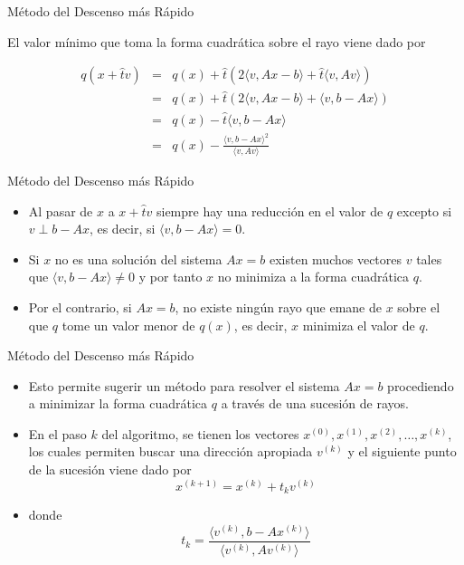 \documentclass[10pt]{beamer}
\begin{document}
\begin{frame}{M\'etodo del Descenso m\'as R\'apido}
  
El valor m\'inimo que toma la forma cuadr\'atica sobre el rayo viene dado por

\begin{eqnarray}
\nonumber  q(x+\hat t v) & = & q(x) + \hat t\left(2\langle v,Ax-b \rangle + \hat t\langle v,Av \rangle\right)\\
\nonumber & = & q(x) + \hat t\left(2\langle v,Ax-b \rangle + \langle v,b-Ax \rangle\right)\\
\nonumber & = & q(x) - \hat t\langle v,b-Ax \rangle\\
\nonumber & = & q(x) - \frac{\langle v,b-Ax \rangle^2}{\langle v,Av\rangle}
\end{eqnarray}
\end{frame}
\begin{frame}{M\'etodo del Descenso m\'as R\'apido}
  \begin{itemize}
    \item Al pasar de $x$ a $x+\hat tv$ siempre hay una reducci\'on en el valor de $q$ excepto si $v \perp b-Ax$, es decir, si $\langle v,b-Ax\rangle=0$.
    \item<2->Si $x$ no es una soluci\'on del sistema $Ax=b$ existen muchos vectores $v$ tales que $\langle v,b-Ax\rangle\neq0$
y por tanto $ x$ no minimiza a la forma cuadr\'atica $q$.
\item<3->Por el contrario, si $Ax=b$, no existe ning\'un rayo que emane de $x$ sobre el que $q$ tome un valor menor de $q(x)$, es decir, $x$ minimiza el valor de $q$.
\end{itemize}
\end{frame}
\begin{frame}{M\'etodo del Descenso m\'as R\'apido}
  \begin{itemize}
    \item<1->Esto permite sugerir un m\'etodo para resolver el sistema $Ax=b$ procediendo a minimizar la forma cuadr\'atica $q$ a trav\'es de una sucesi\'on de rayos.
    \item<2->En el paso $k$ del algoritmo, se tienen los vectores $x^{(0)},x^{(1)},x^{(2)},\ldots,x^{(k)}$, los cuales permiten buscar una direcci\'on apropiada $v^{(k)}$ y el siguiente punto de la sucesi\'on viene dado por
$$
x^{(k+1)} = x^{(k)} + t_kv^{(k)}
$$

\item<3->donde 
$$
 t_k = \frac{\langle v^{(k)},b-Ax^{(k)}\rangle}{\langle v^{(k)},Av^{(k)}\rangle}
$$
\end{itemize}
\end{frame}
\end{document}
